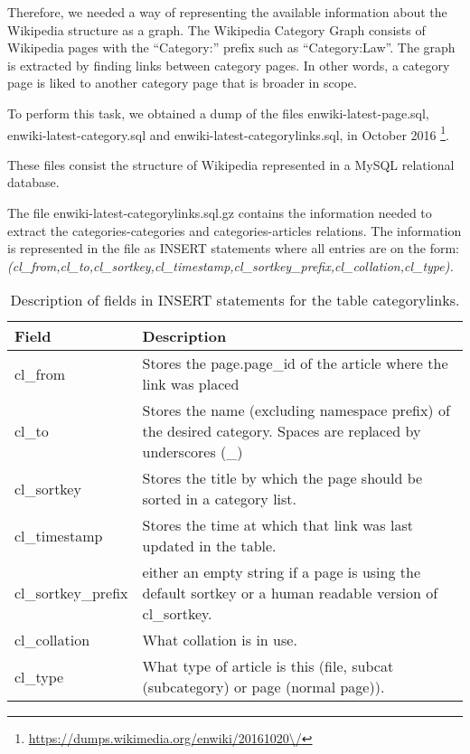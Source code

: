 Therefore, we needed a way of representing the available information about the Wikipedia structure as a graph. The Wikipedia Category Graph consists of Wikipedia pages with the “Category:” prefix such as “Category:Law”. The graph is extracted by finding links between category pages. In other words, a category page is liked to another category page that is broader in scope.

To perform this task, we obtained a dump of the files enwiki-latest-page.sql, enwiki-latest-category.sql and enwiki-latest-categorylinks.sql, in October 2016 \footnote{\url{https://dumps.wikimedia.org/enwiki/20161020\/}}.

These files consist the structure of Wikipedia represented in a MySQL relational database.

The file enwiki-latest-categorylinks.sql.gz contains the information needed to extract the categories-categories and categories-articles relations. The information is represented in the file as INSERT statements where all entries are on the form: \\
\textit{
(cl\_from,cl\_to,cl\_sortkey,cl\_timestamp,cl\_sortkey\_prefix,cl\_collation,cl\_type). }



\begin{table}[H]
\begin{adjustbox}{width=1\textwidth}
\begin{tabular}{@{}ll@{}}
\toprule
Field               & Description                                                                                                   \\ \midrule
cl\_from            & Stores the page.page\_id of the article where the link was placed                                             \\
cl\_to              & Stores the name (excluding namespace prefix) of the desired category. Spaces are replaced by underscores (\_) \\
cl\_sortkey         & Stores the title by which the page should be sorted in a category list.                                       \\
cl\_timestamp       & Stores the time at which that link was last updated in the table.                                             \\
cl\_sortkey\_prefix & either an empty string if a page is using the default sortkey or a human readable version of cl\_sortkey.     \\
cl\_collation       & What collation is in use.                                                                                    \\
cl\_type            & What type of article is this (file, subcat (subcategory) or page (normal page)).                              \\ \bottomrule
\end{tabular}
\end{adjustbox}
\caption{Description of fields in INSERT statements for the table categorylinks.}
\label{tab:categorylinks}
\end{table}

